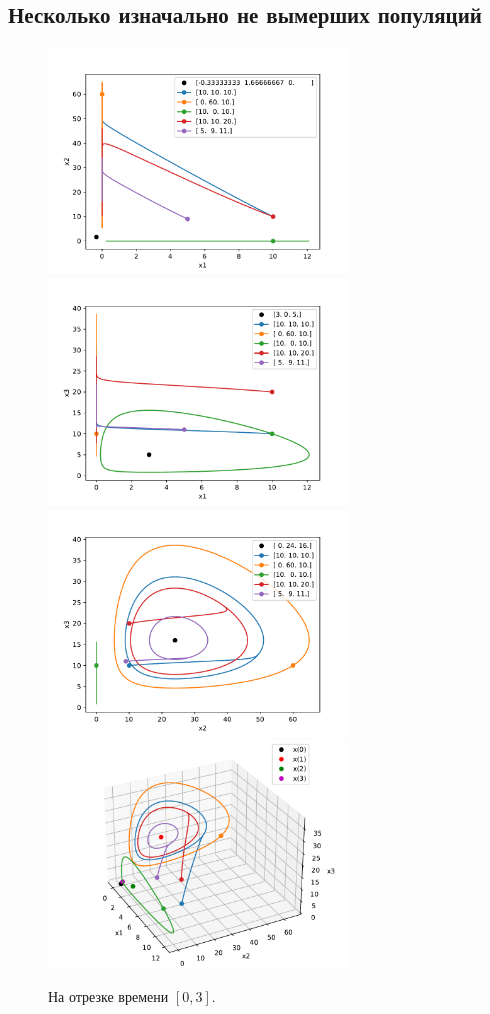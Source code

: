     \subsection{Несколько изначально не вымерших популяций}
    \begin{figure}[H]
        \includegraphics[width=8cm]{pictures/x_12phase.pdf}
        \includegraphics[width=8cm]{pictures/x_13phase.pdf}
        \includegraphics[width=8cm]{pictures/x_23phase.pdf}
        \includegraphics[width=8cm]{pictures/x_phase3.pdf}
        \caption{На отрезке времени \( [0, 3] \).}
    \end{figure}